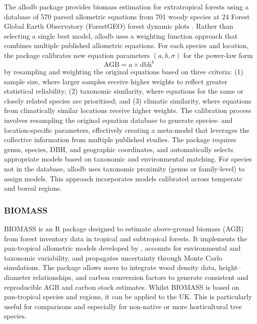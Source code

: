 \documentclass[12pt,a4paper]{article}
\begin{document}
The allodb package \citep{Gonzalez-Akre2022} provides biomass estimation for extratropical forests using a database of 570 parsed allometric equations from 701 woody species at 24 Forest Global Earth Observatory (ForestGEO) forest dynamic plots \citep{Anderson-Teixeira2015, Davies2021}. Rather than selecting a single best model, allodb uses a weighting function approach that combines multiple published allometric equations. For each species and location, the package calibrates new equation parameters $(a, b, \sigma)$ for the power-law form
\begin{equation}
  \text{AGB} = a \times \text{dbh}^b
\end{equation}
by resampling and weighting the original equations based on three criteria: (1) sample size, where larger samples receive higher weights to reflect greater statistical reliability; (2) taxonomic similarity, where equations for the same or closely related species are prioritised; and (3) climatic similarity, where equations from climatically similar locations receive higher weights. The calibration process involves resampling the original equation database to generate species- and location-specific parameters, effectively creating a meta-model that leverages the collective information from multiple published studies. The package requires genus, species, DBH, and geographic coordinates, and automatically selects appropriate models based on taxonomic and environmental matching. For species not in the database, allodb uses taxonomic proximity (genus or family-level) to assign models. This approach incorporates models calibrated across temperate and boreal regions.

\subsubsection{BIOMASS}

BIOMASS \citep{Rejou-Mechain2017} is an R package designed to estimate above-ground biomass (AGB) from forest inventory data in tropical and subtropical forests. It implements the pan-tropical allometric models developed by \citet{Chave2014}, accounts for environmental and taxonomic variability, and propagates uncertainty through Monte Carlo simulations. The package allows users to integrate wood density data, height--diameter relationships, and carbon conversion factors to generate consistent and reproducible AGB and carbon stock estimates. Whilst BIOMASS is based on pan-tropical species and regions, it can be applied to the UK. This is particularly useful for comparisons and especially for non-native or more horticultural tree species.
\end{document}
